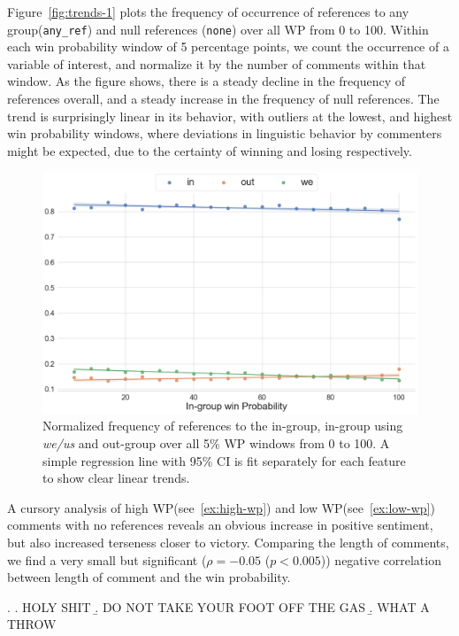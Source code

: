 Figure~\ref{fig:trends-1} plots the frequency of occurrence of references to any group(\texttt{any\_ref}) and null references (\texttt{none}) over all WP from 0 to 100. Within each win probability window of 5 percentage points, we count the occurrence of a variable of interest, and normalize it by the number of comments within that window. As the figure shows, there is a steady decline in the frequency of references overall, and a steady increase in the frequency of null references. The trend is surprisingly linear in its behavior, with outliers at the lowest, and highest win probability windows, where deviations in linguistic behavior by commenters might be expected, due to the certainty of winning and losing respectively.

\begin{figure}[t]
     \centering
     \includegraphics[width=\linewidth]{figures/trends-2.png}
     \caption{Normalized frequency of references to the in-group, in-group using \emph{we/us} and out-group over all 5\% WP windows from 0 to 100. A simple regression line with 95\% CI is fit separately for each feature to show clear linear trends.}
     \label{fig:trends-2}
 \end{figure}

A cursory analysis of high WP(see~\ref{ex:high-wp}) and low WP(see~\ref{ex:low-wp}) comments with no references reveals an obvious increase in positive sentiment, but also increased terseness closer to victory. Comparing the length of comments, we find a very small but significant ($\rho=-0.05$ ($p<0.005$)) negative correlation between length of comment and the win probability.

\ex.\label{ex:high-wp} \a. HOLY SHIT 
     \b. DO NOT TAKE YOUR FOOT OFF THE GAS
     \b. WHAT A THROW
     
